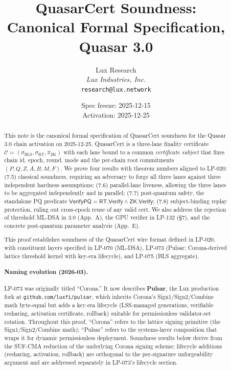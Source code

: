 \documentclass[11pt]{article}
\title{QuasarCert Soundness:\\
{\large Canonical Formal Specification, Quasar 3.0}}
\author{Lux Research\\
\textit{Lux Industries, Inc.}\\
\texttt{research@lux.network}}
\date{Spec freeze: 2025-12-15 \\ Activation: 2025-12-25}
\begin{document}
\maketitle

\begin{abstract}
This note is the canonical formal specification of QuasarCert soundness
for the Quasar 3.0 chain activation on 2025-12-25.  QuasarCert is a
three-lane finality certificate
$\mathcal{C} = (\sigma_{\mathrm{BLS}}, \sigma_{\mathrm{RT}},
\pi_{\mathrm{ZK}})$ with each lane bound to a common
\emph{certificate subject} that fixes chain id, epoch, round, mode and
the per-chain root commitments $(P, Q, Z, A, B, M, F)$.  We prove four
results with theorem numbers aligned to LP-020:
(7.5) classical soundness, requiring an adversary to forge all three
lanes against three independent hardness assumptions;
(7.6) parallel-lane liveness, allowing the three lanes to be aggregated
independently and in parallel;
(7.7) post-quantum safety, the standalone PQ predicate
$\mathsf{VerifyPQ} = \mathsf{RT.Verify} \land \mathsf{ZK.Verify}$;
(7.8) subject-binding replay protection, ruling out cross-epoch reuse of
any valid cert.  We also address the rejection of threshold ML-DSA in
3.0 (App.~A), the GPU verifier in LP-132 (\S7), and the concrete
post-quantum parameter analysis (App.~E).

This proof establishes soundness of the QuasarCert wire format defined in LP-020, with constituent layers specified in LP-070 (ML-DSA), LP-073 (Pulsar; Corona-derived lattice threshold kernel with key-era lifecycle), and LP-075 (BLS aggregate).

\paragraph{Naming evolution (2026-03).} LP-073 was originally titled ``Corona.'' It now describes \textbf{Pulsar}, the Lux production fork at \texttt{github.com/luxfi/pulsar}, which inherits Corona's Sign1/Sign2/Combine math byte-equal but adds a key-era lifecycle (LSS-managed generations, verifiable resharing, activation certificate, rollback) suitable for permissionless validator-set rotation. Throughout this proof, ``Corona'' refers to the lattice signing primitive (the Sign1/Sign2/Combine math); ``Pulsar'' refers to the systems-layer composition that wraps it for dynamic permissionless deployment. Soundness results below derive from the SUF-CMA reduction of the underlying Corona signing scheme; lifecycle additions (resharing, activation, rollback) are orthogonal to the per-signature unforgeability argument and are addressed separately in LP-073's lifecycle section.
\end{abstract}
\end{document}
